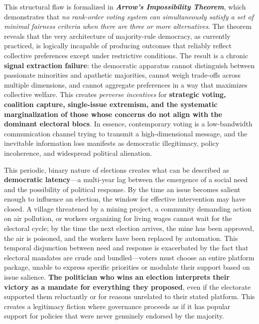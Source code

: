 This structural flaw is formalized in \textbf{\emph{Arrow's
Impossibility Theorem}}, which demonstrates that \emph{no rank-order
voting system can simultaneously satisfy a set of minimal fairness
criteria when there are three or more alternatives}. The theorem reveals
that the very architecture of majority-rule democracy, as currently
practiced, is logically incapable of producing outcomes that reliably
reflect collective preferences except under restrictive conditions. The
result is a chronic \textbf{signal extraction failure}: the democratic
apparatus cannot distinguish between passionate minorities and apathetic
majorities, cannot weigh trade-offs across multiple dimensions, and
cannot aggregate preferences in a way that maximizes collective welfare.
This creates \emph{perverse incentives} for \textbf{strategic voting,
coalition capture, single-issue extremism, and the systematic
marginalization of those whose concerns do not align with the dominant
electoral blocs}. In essence, contemporary voting is a low-bandwidth
communication channel trying to transmit a high-dimensional message, and
the inevitable information loss manifests as democratic illegitimacy,
policy incoherence, and widespread political alienation.

This periodic, binary nature of elections creates what can be described
as \textbf{democratic latency}---a multi-year lag between the emergence
of a social need and the possibility of political response. By the time
an issue becomes salient enough to influence an election, the window for
effective intervention may have closed. A village threatened by a mining
project, a community demanding action on air pollution, or workers
organizing for living wages cannot wait for the electoral cycle; by the
time the next election arrives, the mine has been approved, the air is
poisoned, and the workers have been replaced by automation. This
temporal disjunction between need and response is exacerbated by the
fact that electoral mandates are crude and bundled---voters must choose
an entire platform package, unable to express specific priorities or
modulate their support based on issue salience. \textbf{The politician
who wins an election interprets their victory as a mandate for
everything they proposed}, even if the electorate supported them
reluctantly or for reasons unrelated to their stated platform. This
creates a legitimacy fiction where governance proceeds as if it has
popular support for policies that were never genuinely endorsed by the
majority.

